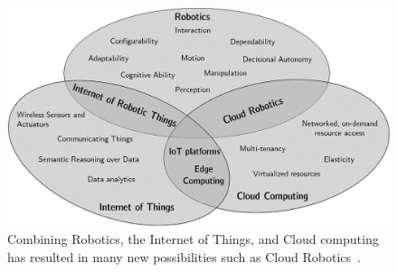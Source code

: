 \begin{figure}[b!]
    \begin{center}
        \includegraphics[width=0.8\linewidth]{figures/TradeStudy/figure3.jpg}
        \caption[Cloud Robotics]{Combining Robotics, the Internet of Things, and Cloud computing has resulted in many new possibilities such as Cloud Robotics~\citep{simoens_internet_2018}.}
        \label{figure-hari:cloudrobotics}
    \end{center}
\end{figure}

